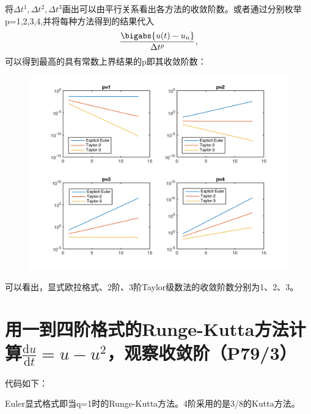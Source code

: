 \documentclass{homework}
\begin{document}
将$\Delta t^1,\Delta t^2,\Delta t^3$画出可以由平行关系看出各方法的收敛阶数。或者通过分别枚举p=1,2,3,4,并将每种方法得到的结果代入$$\frac{\bigabs{u(t)-u_n}}{\Delta t^p},$$可以得到最高的具有常数上界结果的p即其收敛阶数：
\begin{figure}[H]
\includegraphics[width=0.9\linewidth]{TsepP.png}
\centering
\end{figure}
可以看出，显式欧拉格式、2阶、3阶Taylor级数法的收敛阶数分别为1、2、3。
\section{用一到四阶格式的Runge-Kutta方法计算$\frac{\mathrm{d}u}{\mathrm{d}t}=u-u^2$，观察收敛阶（P79/3）}
代码如下：

Euler显式格式即当q=1时的Runge-Kutta方法。4阶采用的是3/8的Kutta方法。
\end{document}

